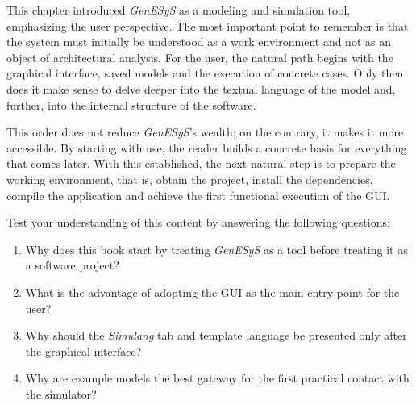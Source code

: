 This chapter introduced \textit{GenESyS} as a modeling and simulation tool, emphasizing the user perspective. The most important point to remember is that the system must initially be understood as a work environment and not as an object of architectural analysis. For the user, the natural path begins with the graphical interface, saved models and the execution of concrete cases. Only then does it make sense to delve deeper into the textual language of the model and, further, into the internal structure of the software.

This order does not reduce \textit{GenESyS}'s wealth; on the contrary, it makes it more accessible. By starting with use, the reader builds a concrete basis for everything that comes later. With this established, the next natural step is to prepare the working environment, that is, obtain the project, install the dependencies, compile the application and achieve the first functional execution of the GUI.

Test your understanding of this content by answering the following questions:

\begin{enumerate}
\item Why does this book start by treating \textit{GenESyS} as a tool before treating it as a software project?

\item What is the advantage of adopting the GUI as the main entry point for the user?

\item Why should the \textit{Simulang} tab and template language be presented only after the graphical interface?

\item Why are example models the best gateway for the first practical contact with the simulator?
\end{enumerate}

